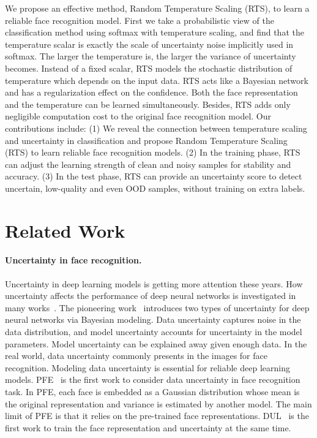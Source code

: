 \documentclass[letterpaper]{article} %
\begin{document}
We propose an effective method, Random Temperature Scaling (RTS), to learn a reliable face recognition model.
First we take a probabilistic view of the classification method using softmax with temperature scaling, and find that the temperature scalar is exactly the scale of uncertainty noise implicitly used in softmax. The larger the temperature is, the larger the variance of uncertainty becomes.
Instead of a fixed scalar, RTS models the stochastic distribution of temperature which depends on the input data. RTS acts like a Bayesian network~\cite{gal2016dropout,theobald2021bayesian} and has a regularization effect on the confidence.
Both the face representation and the temperature can be learned simultaneously. Besides, RTS adds only negligible computation cost to the original face recognition model.
Our contributions include:
(1) We reveal the connection between temperature scaling and uncertainty in classification and propose Random Temperature Scaling (RTS) to learn reliable face recognition models.
(2) In the training phase, RTS can adjust the learning strength of clean and noisy samples for stability and accuracy.
(3) In the test phase, RTS can provide an uncertainty score to detect uncertain, low-quality and even OOD samples, without training on extra labels.


\section{Related Work}
\label{sec:related}

\paragraph{Uncertainty in face recognition.}
Uncertainty in deep learning models is getting more attention these years. How uncertainty affects the performance of deep neural networks is investigated in many works~\cite{gal2016dropout,blundell2015weight,kendall2017uncertainties}.
The pioneering work~\cite{kendall2017uncertainties} introduces two types of uncertainty for deep neural networks via Bayesian modeling. Data uncertainty captures noise in the data distribution, and model uncertainty accounts for uncertainty in the model parameters. Model uncertainty can be explained away given enough data.
In the real world, data uncertainty commonly presents in the images for face recognition. Modeling data uncertainty is essential for reliable deep learning models.
PFE~\cite{shi2019probabilistic} is the first work to consider data uncertainty in face recognition task. In PFE, each face is embedded as a Gaussian distribution whose mean is the original representation and variance is estimated by another model. The main limit of PFE is that it relies on the pre-trained face representations.
DUL~\cite{chang2020data} is the first work to train the face representation and uncertainty at the same time.
\end{document}
